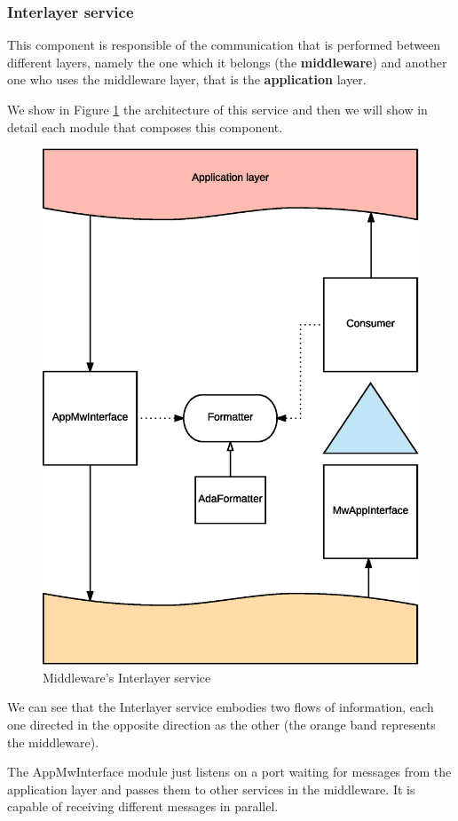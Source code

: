\subsubsection{Interlayer service}

This component is responsible of the communication that is performed between
different layers, namely the one which it belongs (the \textbf{middleware}) and
another one who uses the middleware layer, that is the \textbf{application}
layer.

We show in Figure \ref{fig:mw-interlayer} the architecture of this service and
then we will show in detail each module that composes this component.

\begin{figure}[H]
  \centering
  \includegraphics[width=.8\columnwidth]{images/solution/mw/int/architect.eps}
  \caption{Middleware's Interlayer service}
  \label{fig:mw-interlayer}
\end{figure}

We can see that the Interlayer service embodies two flows of information, each
one directed in the opposite direction as the other (the orange band represents
the middleware).

The AppMwInterface module just listens on a port waiting for messages from
the application layer and passes them to other services in the middleware.
It is capable of receiving different messages in parallel.

